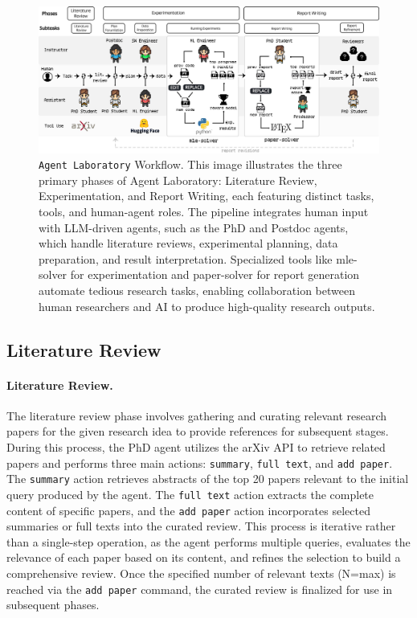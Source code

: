 \documentclass[11pt, a4paper]{gdm_format}
\begin{document}
\begin{figure}
    \centering
    \includegraphics[width=0.99\linewidth]{images/jpgs/Agent-Lab-Workflow.jpg}
    \caption{\texttt{Agent Laboratory} Workflow. This image illustrates the three primary phases of Agent Laboratory: Literature Review, Experimentation, and Report Writing, each featuring distinct tasks, tools, and human-agent roles. The pipeline integrates human input with LLM-driven agents, such as the PhD and Postdoc agents, which handle literature reviews, experimental planning, data preparation, and result interpretation. Specialized tools like mle-solver for experimentation and paper-solver for report generation automate tedious research tasks, enabling collaboration between human researchers and AI to produce high-quality research outputs.}
    \label{fig:AgentWorkflow}
\end{figure}


\subsection{Literature Review}
\label{sec:lit_review}
\paragraph{Literature Review.} 
The literature review phase involves gathering and curating relevant research papers for the given research idea to provide references for subsequent stages. During this process, the PhD agent utilizes the arXiv API to retrieve related papers and performs three main actions: \texttt{summary}, \texttt{full text}, and \texttt{add paper}. The \texttt{summary} action retrieves abstracts of the top 20 papers relevant to the initial query produced by the agent. The \texttt{full text} action extracts the complete content of specific papers, and the \texttt{add paper} action incorporates selected summaries or full texts into the curated review. This process is iterative rather than a single-step operation, as the agent performs multiple queries, evaluates the relevance of each paper based on its content, and refines the selection to build a comprehensive review. Once the specified number of relevant texts (N=max) is reached via the \texttt{add paper} command, the curated review is finalized for use in subsequent phases.
\end{document}
